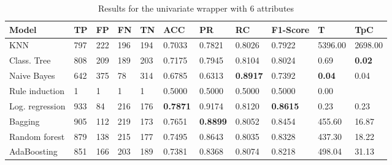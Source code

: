 \documentclass[a4paper,11pt]{article}
\begin{document}
\begin{table}
\centering

\begin{tabular}{|l|l|l|l|l|l|l|l|l|l|l|}
\hline

\textbf{Model} & \textbf{TP} & \textbf{FP} & \textbf{FN} & \textbf{TN} & \textbf{ACC} & \textbf{PR} & \textbf{RC} & \textbf{F1-Score} & \textbf{T} & \textbf{TpC} \\ \hline
KNN & 797 & 222 & 196 & 194 & 0.7033 & 0.7821 & 0.8026 & 0.7922 & 5396.00 & 2698.00 \\ \hline
Class. Tree & 808 & 209 & 189 & 203 & 0.7175 & 0.7945 & 0.8104 & 0.8024 & 0.69 & \textbf{0.02} \\ \hline
Naive Bayes & 642 & 375 & 78 & 314 & 0.6785 & 0.6313 & \textbf{0.8917} & 0.7392 & \textbf{0.04} & 0.04 \\ \hline
Rule induction & 1 & 1 & 1 & 1 & 0.5000 & 0.5000 & 0.5000 & 0.5000 & 0.00 \\ \hline
Log. regression & 933 & 84 & 216 & 176 & \textbf{0.7871} & 0.9174 & 0.8120 & \textbf{0.8615} & 0.23 & 0.23 \\ \hline
Bagging & 905 & 112 & 219 & 173 & 0.7651 & \textbf{0.8899} & 0.8052 & 0.8454 & 455.60 & 16.87 \\ \hline
Random forest & 879 & 138 & 215 & 177 & 0.7495 & 0.8643 & 0.8035 & 0.8328 & 437.30 & 18.22 \\ \hline
AdaBoosting & 851 & 166 & 203 & 189 & 0.7381 & 0.8368 & 0.8074 & 0.8218 & 498.04 & 31.13 \\ \hline

\end{tabular}
\caption{Results for the univariate wrapper with 6 attributes}
\label{class:w25u}
\end{table}
\end{document}
